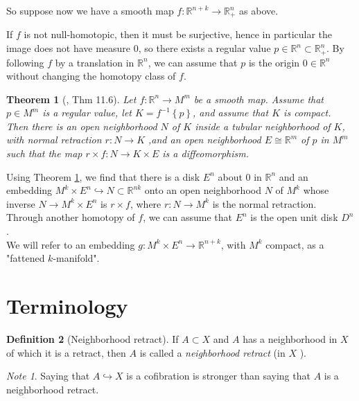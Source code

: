 \documentclass[reqno]{amsart}
\newtheorem{theorem}{Theorem}[section]
\theoremstyle{definition}
\newtheorem{definition}[theorem]{Definition}
\theoremstyle{remark}
\newtheorem*{note}{Note}
\begin{document}
So suppose now we have a smooth map $f \colon
\mathbb{R}^{n+k} \to \mathbb{R}_+^{n}$ as above.

If $f$ is not null-homotopic, then it must be surjective, hence
in particular the image does not have measure $0$, so there
exists a regular value
$p \in \mathbb{R}^{n} \subset \mathbb{R}_+^{n}$.
By following $f$ by a translation in $\mathbb{R}^{n}$,
we can assume that $p$ is the origin $0 \in \mathbb{R}^{n}$ without
changing the homotopy class of $f$.

\begin{theorem}[\cite{Bredon}, Thm 11.6]\label{Thm:XLOOQKK}
    Let $f \colon \mathbb{R}^{n} \to M^{m}$ be a smooth
    map. Assume that $p \in M^{m}$ is a regular
    value, let $K = f^{-1} \left\{ p \right\} $, and
    assume that $K$ is compact. Then there
    is an open neighborhood $N$ of $K$ inside a tubular neighborhood
    of $K$, with normal retraction $r \colon N \to K$ ,and
    an open neighborhood $E \cong \mathbb{R}^{m}$ of
    $p$ in $M^{m}$ such that the map
    $r \times f \colon N \to K \times E$ is a diffeomorphism.
\end{theorem}

Using Theorem \ref{Thm:XLOOQKK}, we find that
there is a disk $E^{n}$ about $0$ in $\mathbb{R}^{n}$ and
an embedding $M^{k} \times E^{n} \hookrightarrow 
N \subset \mathbb{R}^{n k} $ onto an open neighborhood
$N$ of $M^{k}$ whose inverse $N \to 
M^{k} \times E^{n}$ is $r \times f$, where
$r \colon N \to  M^{k}$ is the normal retraction.\\
\linebreak
Through another homotopy of $f$, we can assume that
$E^{n}$ is the open unit disk
$D^{n}$.\\

We will refer to an embedding
$g \colon M^{k} \times E^{n} \to \mathbb{R}^{n+k}$, with
$M^{k}$ compact, as a
"fattened $k$-manifold".




\section{Terminology}

\begin{definition}[Neighborhood retract]
    If $A \subset X$ and $A$ has a neighborhood in $X$ of
    which it is a retract, then $A$ is called
    a \textit{neighborhood retract} (in $X$ ).
\end{definition}

\begin{note}
    Saying that $A \hookrightarrow X$ is a cofibration
    is stronger than saying that $A$ is a neighborhood retract.
\end{note}
\end{document}
